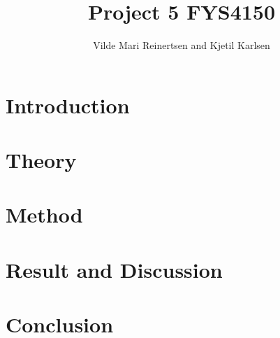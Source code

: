 



\title{Project 5 FYS4150}
\author{Vilde Mari Reinertsen and Kjetil Karlsen}
\raggedbottom



\maketitle

\pagestyle{fancy}


\begin{abstract}
\footnotesize






  
\tableofcontents
\end{abstract}


\section{Introduction}


\section{Theory}


\section{Method}


\section{Result and Discussion\label{sec:res}}


%

\section{Conclusion}


\newpage






